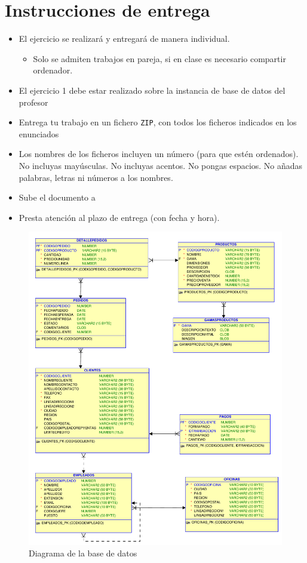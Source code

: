 \newpage
\section{Instrucciones de entrega}
\begin{itemize}
\item El ejercicio se realizará y entregará de manera individual.
  \begin{itemize}
  \item Solo se admiten trabajos en pareja, si en clase es necesario compartir ordenador.
  \end{itemize}
\item El ejercicio 1 debe estar realizado sobre la instancia de base de datos del profesor
\item Entrega tu trabajo en un fichero \texttt{ZIP}, con todos los ficheros indicados en los enunciados
\item Los nombres de los ficheros incluyen un número (para que estén ordenados). No incluyas mayúsculas. No incluyas acentos. No pongas espacios. No añadas palabras, letras ni números a los nombres.
\item Sube el documento a 
\item Presta atención al plazo de entrega (con fecha y hora).  
\end{itemize}



\begin{figure}[h]
  \begin{center}
    \includegraphics[width=.9\textwidth]{./jardineria.pdf}
  \end{center}
  \caption{Diagrama de la base de datos}\label{fig:esquema}
\end{figure}






